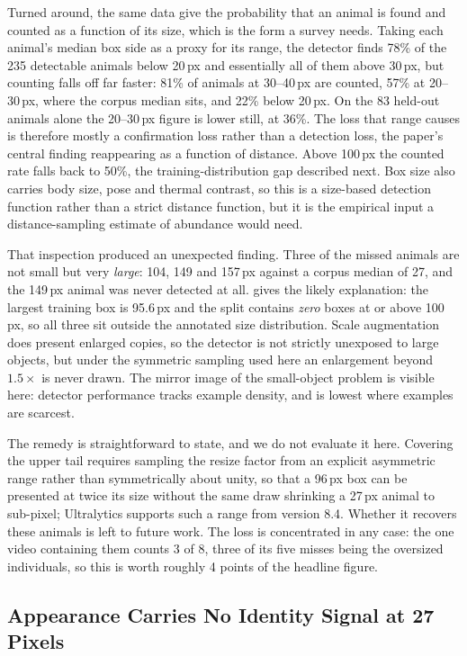 Turned around, the same data give the probability that an animal is found and counted as a
function of its size, which is the form a survey needs. Taking each animal's median box side
as a proxy for its range, the detector finds 78\% of the 235 detectable animals below 20\,px
and essentially all of them above 30\,px, but counting falls off far faster: 81\% of animals
at 30--40\,px are counted, 57\% at 20--30\,px, where the corpus median sits, and 22\% below
20\,px. On the 83 held-out animals alone the 20--30\,px figure is lower still, at 36\%. The
loss that range causes is therefore mostly a confirmation loss rather than a detection loss,
the paper's central finding reappearing as a function of distance. Above 100\,px the counted
rate falls back to 50\%, the training-distribution gap described next. Box size also carries
body size, pose and thermal contrast, so this is a size-based detection function rather than
a strict distance function, but it is the empirical input a distance-sampling estimate of
abundance would need.

That inspection produced an unexpected finding. Three of the missed animals are not small but
very \emph{large}: 104, 149 and 157\,px against a corpus median of 27, and the 149\,px animal
was never detected at all.  gives the likely explanation: the largest
training box is 95.6\,px and the split contains \emph{zero} boxes at or above 100\,px, so all
three sit outside the annotated size distribution. Scale augmentation does present enlarged
copies, so the detector is not strictly unexposed to large objects, but under the symmetric
sampling used here an enlargement beyond $1.5\times$ is never drawn. The mirror image of the
small-object problem is visible here: detector performance tracks example density, and is lowest where examples are scarcest.

The remedy is straightforward to state, and we do not evaluate it here. Covering the upper
tail requires sampling the resize factor from an explicit asymmetric range rather than
symmetrically about unity, so that a 96\,px box can be presented at twice its size without
the same draw shrinking a 27\,px animal to sub-pixel; Ultralytics supports such a range from
version 8.4. Whether it recovers these animals is left to future work. The loss is
concentrated in any case: the one video containing them counts 3 of 8, three of its five
misses being the oversized individuals, so this is worth roughly 4 points of the headline
figure.

\subsection{Appearance Carries No Identity Signal at 27 Pixels}
\label{sec:reid}

